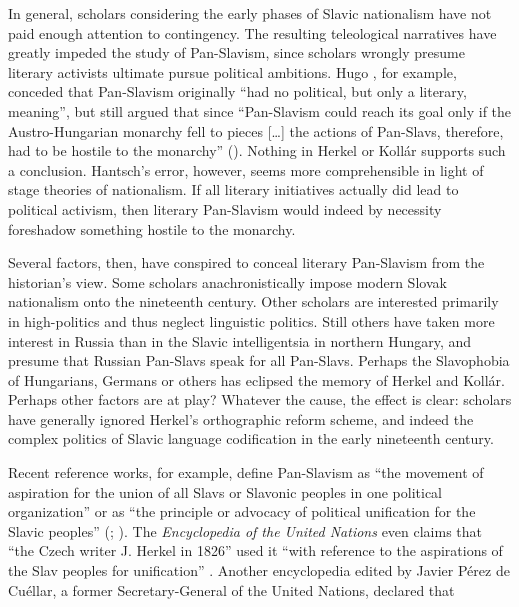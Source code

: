 In general, scholars considering the early phases of Slavic nationalism have not paid enough attention to contingency. The resulting teleological narratives have greatly impeded the study of Pan-Slavism, since scholars wrongly presume literary activists ultimate pursue political ambitions. Hugo \citet[23]{hantsch_pan-slavism_1965}, for example, conceded that Pan-Slavism originally “had no political, but only a literary, meaning”, but still argued that since “Pan-Slavism could reach its goal only if the Austro-Hungarian monarchy fell to pieces […] the actions of Pan-Slavs, therefore, had to be hostile to the monarchy” (\citeyear[25]{hantsch_pan-slavism_1965}). Nothing in Herkel or Kollár supports such a conclusion. Hantsch’s error, however, seems more comprehensible in light of stage theories of nationalism. If all literary initiatives actually did lead to political activism, then literary Pan-Slavism would indeed by necessity foreshadow something hostile to the monarchy.

\largerpage
Several factors, then, have conspired to conceal literary Pan-Slavism from the historian’s view. Some scholars anachronistically impose modern Slovak nationalism onto the nineteenth century. Other scholars are interested primarily in high-politics and thus neglect linguistic politics. Still others have taken more interest in Russia than in the Slavic intelligentsia in northern Hungary, and presume that Russian Pan-Slavs speak for all Pan-Slavs. Perhaps the Slavophobia of Hungarians, Germans or others has eclipsed the memory of Herkel and Kollár. Perhaps other factors are at play? Whatever the cause, the effect is clear: scholars have generally ignored Herkel’s orthographic reform scheme, and indeed the complex politics of Slavic language codification in the early nineteenth century.

Recent reference works, for example, define Pan-Slavism as “the movement of aspiration for the union of all Slavs or Slavonic peoples in one political organization” or as “the principle or advocacy of political unification for the Slavic peoples” (\cite[1265]{simpson_compact_1991}; \cite[312]{atkin_wiley-blackwell_2011}). The \textit{Encyclopedia of the United Nations} even claims that “the Czech writer J. Herkel in 1826” used it “with reference to the aspirations of the Slav peoples for unification” \citep[1762]{osmanczyk_encylopedia_2003}. Another encyclopedia edited by Javier Pérez de Cuéllar, a former Secretary-General of the United Nations, declared that

